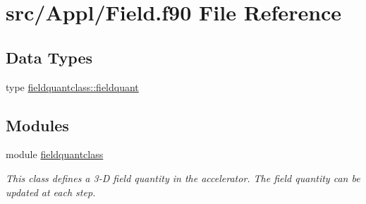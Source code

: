 \hypertarget{_field_8f90}{}\section{src/\+Appl/\+Field.f90 File Reference}
\label{_field_8f90}
\subsection*{Data Types}
\begin{DoxyCompactItemize}
\item 
type \mbox{\hyperlink{namespacefieldquantclass_structfieldquantclass_1_1fieldquant}{fieldquantclass\+::fieldquant}}
\end{DoxyCompactItemize}
\subsection*{Modules}
\begin{DoxyCompactItemize}
\item 
module \mbox{\hyperlink{namespacefieldquantclass}{fieldquantclass}}
\begin{DoxyCompactList}\small\item\em This class defines a 3-\/D field quantity in the accelerator. The field quantity can be updated at each step. \end{DoxyCompactList}\end{DoxyCompactItemize}
